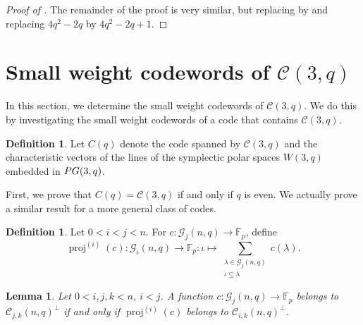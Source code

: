 \documentclass[a4paper]{article}
\newtheorem{lm}[thm]{Lemma}
\theoremstyle{definition}
\newtheorem{df}[thm]{Definition}
\newcommand{\FF}{\mathbb F}
\newcommand{\pg}{\textnormal{PG}}
\newcommand{\mc}{\mathcal C}
\newcommand{\mg}{\mathcal G}
\DeclareMathOperator{\proj}{proj}
\newcommand{\old}[1]{}%
\begin{document}
\begin{proof}[Proof of ]
    The remainder of the proof is very similar, but replacing  by  and replacing \(4q^2-2q\) by \(4q^2-2q+1\).
\end{proof}



\section{Small weight codewords of \texorpdfstring{$\mc(3,q)$}{C(3,q)}}
 \label{Sec:MinWt}

In this section, we determine the small weight codewords of $\mc(3,q)$.
We do this by investigating the small weight codewords of a code that contains $\mc(3,q)$.

\begin{df}
 Let $C(q)$ denote the code spanned by $\mc(3,q)$ and the characteristic vectors of the lines of the symplectic polar spaces $W(3,q)$ embedded in $\pg(3,q)$.
\end{df}

First, we prove that $C(q) = \mc(3,q)$ if and only if $q$ is even.
We actually prove a similar result for a more general class of codes.

\old{\begin{df}
 For $c: \mg_1(3,q) \to \FF_p$, define
 \[
  \proj(c) : \mg_0(3,q) \to \FF_p:
  P \mapsto \sum_{\substack{\ell \in \mg_1(3,q)\\P\in\ell}} c(\ell).
 \]
\end{df}}
\begin{df}
 Let $0<i<j<n$. For $c: \mg_j(n,q) \to \FF_p$, define
 \[
  \proj^{(i)}(c) : \mg_i(n,q) \to \FF_p:
  \iota \mapsto \sum_{\substack{\lambda \in \mg_j(n,q)\\\iota\subseteq\lambda}} c(\lambda).
 \]
\end{df}

\old{\begin{lm}
A function $c: \mg_1(3,q) \to \FF_p$ belongs to  $\mc(3,q)^\perp$ if and only if $\proj(c)$ belongs to $\mc_{0,1}(3,q)^\perp$.
\end{lm}}

\begin{lm}\label{Lm:Proj}
Let $0<i,j,k<n$, $i<j$. A function $c: \mg_j(n,q) \to \FF_p$ belongs to  $\mc_{j,k}(n,q)^\perp$ if and only if $\proj^{(i)}(c)$ belongs to $\mc_{i,k}(n,q)^\perp$.
\end{lm}
\end{document}
